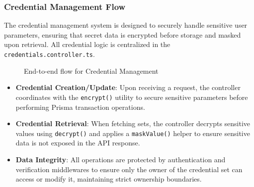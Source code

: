 \subsubsection{Credential Management Flow}

The credential management system is designed to securely handle sensitive user parameters, ensuring that secret data is encrypted before storage and masked upon retrieval. All credential logic is centralized in the \texttt{credentials.controller.ts}.

\begin{figure}[H]
\centering
{}
\caption{End-to-end flow for Credential Management}
\label{fig:cred-flow}
\end{figure}

\begin{itemize}
    \item \textbf{Credential Creation/Update}: Upon receiving a request, the controller coordinates with the \texttt{encrypt()} utility to secure sensitive parameters before performing Prisma transaction operations.
    \item \textbf{Credential Retrieval}: When fetching sets, the controller decrypts sensitive values using \texttt{decrypt()} and applies a \texttt{maskValue()} helper to ensure sensitive data is not exposed in the API response.
    \item \textbf{Data Integrity}: All operations are protected by authentication and verification middlewares to ensure only the owner of the credential set can access or modify it, maintaining strict ownership boundaries.
\end{itemize}
